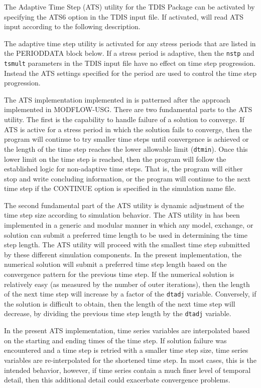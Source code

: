 The Adaptive Time Step (ATS) utility for the TDIS Package can be activated by specifying the ATS6 option in the TDIS input file.  If activated, \mf will read ATS input according to the following description.

The adaptive time step utility is activated for any stress periods that are listed in the PERIODDATA block below.  If a stress period is adaptive, then the \texttt{nstp} and \texttt{tsmult} parameters in the TDIS input file have no effect on time step progression.  Instead the ATS settings specified for the period are used to control the time step progression.

The ATS implementation implemented in \mf is patterned after the approach implemented in MODFLOW-USG.  There are two fundamental parts to the ATS utility.  The first is the capability to handle failure of a solution to converge.  If ATS is active for a stress period in which the solution fails to converge, then the program will continue to try smaller time steps until convergence is achieved or the length of the time step reaches the lower allowable limit (\texttt{dtmin}).  Once this lower limit on the time step is reached, then the program will follow the established logic for non-adaptive time steps.  That is, the program will either stop and write concluding information, or the program will continue to the next time step if the CONTINUE option is specified in the simulation name file.

The second fundamental part of the ATS utility is dynamic adjustment of the time step size according to simulation behavior.  The ATS utility in \mf has been implemented in a generic and modular manner in which any model, exchange, or solution can submit a preferred time length to be used in determining the time step length.  The ATS utility will proceed with the smallest time step submitted by these different simulation components.  In the present implementation, the numerical solution will submit a preferred time step length based on the convergence pattern for the previous time step.  If the numerical solution is relatively easy (as measured by the number of outer iterations), then the length of the next time step will increase by a factor of the \texttt{dtadj} variable.  Conversely, if the solution is difficult to obtain, then the length of the next time step will decrease, by dividing the previous time step length by the \texttt{dtadj} variable.  

In the present ATS implementation, time series variables are interpolated based on the starting and ending times of the time step.  If solution failure was encountered and a time step is retried with a smaller time step size, time series variables are re-interpolated for the shortened time step.  In most cases, this is the intended behavior, however, if time series contain a much finer level of temporal detail, then this additional detail could exacerbate convergence problems.

